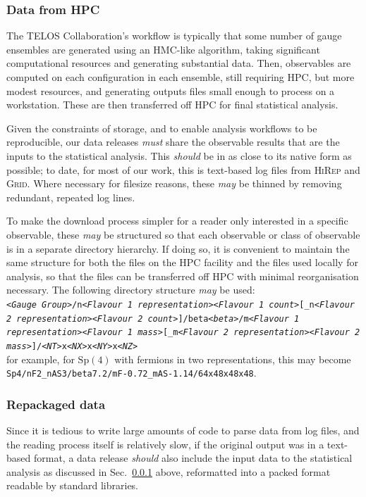 \documentclass{article}
\newcommand\rfcword[1]{\emph{#1}\xspace}
\newcommand\must{\rfcword{must}}
\newcommand\should{\rfcword{should}}
\newcommand\may{\rfcword{may}}
\newcommand\program[1]{\textsc{#1}\xspace}
\begin{document}
\subsubsection{Data from HPC}\label{sec:dr-from-hpc}

The TELOS Collaboration's workflow is typically that
some number of gauge ensembles are generated using an HMC-like algorithm,
taking significant computational resources
and generating substantial data.
Then,
observables are computed on each configuration in each ensemble,
still requiring HPC,
but more modest resources,
and generating outputs files small enough to process on a workstation.
These are then transferred off HPC for final statistical analysis.

Given the constraints of storage,
and to enable analysis workflows to be reproducible,
our data releases \must
share the observable results that are the inputs to the statistical analysis.
This \should be in as close to its native form as possible;
to date,
for most of our work,
this is text-based log files from \program{HiRep} and \program{Grid}.
Where necessary for filesize reasons,
these \may be thinned by removing redundant, repeated log lines.

To make the download process simpler for a reader only interested in a specific observable,
these \may be structured so that
each observable or class of observable
is in a separate directory hierarchy.
If doing so,
it is convenient to maintain the same structure for both
the files on the HPC facility
and the files used locally for analysis,
so that the files can be transferred off HPC with minimal reorganisation necessary.
The following directory structure \may be used:
\\
\texttt{\emph{<Gauge Group>}/n\emph{<Flavour 1 representation><Flavour 1 count>}[\_n\emph{<Flavour 2 representation><Flavour 2 count>}]/beta\emph{<beta>}/m\emph{<Flavour 1 representation><Flavour 1 mass>}[\_m\emph{<Flavour 2 representation><Flavour 2 mass>}]/\emph{<NT>}x\emph{<NX>}x\emph{<NY>}x\emph{<NZ>}}\\
for example,
for $\mathrm{Sp}(4)$ with fermions in two representations,
this may become\\
\texttt{Sp4/nF2\_nAS3/beta7.2/mF-0.72\_mAS-1.14/64x48x48x48}.

\subsubsection{Repackaged data}

Since it is tedious to write large amounts of code to parse data from log files,
and the reading process itself is relatively slow,
if the original output was in a text-based format,
a data release \should also include the input data to the statistical analysis
as discussed in Sec.~\ref{sec:dr-from-hpc} above,
reformatted into a packed format readable by standard libraries.
\end{document}
